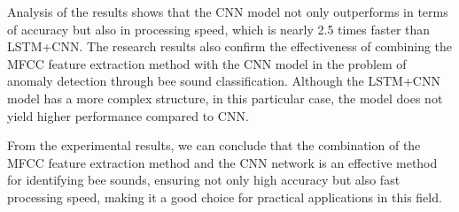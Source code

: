 Analysis of the results shows that the CNN model not only outperforms in terms of accuracy
but also in processing speed, which is nearly 2.5 times faster than LSTM+CNN. The research
results also confirm the effectiveness of combining the MFCC feature extraction method with
the CNN model in the problem of anomaly detection through bee sound classification.
Although the LSTM+CNN model has a more complex structure, in this particular case, the
model does not yield higher performance compared to CNN.

From the experimental results, we can conclude that the combination of the MFCC feature
extraction method and the CNN network is an effective method for identifying bee sounds,
ensuring not only high accuracy but also fast processing speed, making it a good choice
for practical applications in this field.
